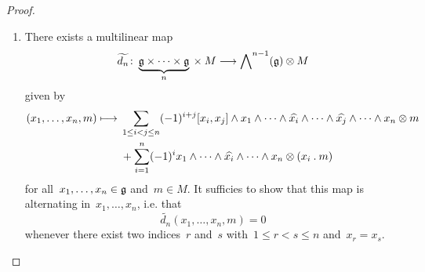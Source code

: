 \begin{proof}
	\leavevmode
	\begin{enumerate}
		\item
			There exists a multilinear map
			\[
				\widetilde{d_n}
				\colon
				\underbrace{ \glie \times \dotsb \times \glie }_{n} {} \times M
				\to
				\Exterior^{n-1}(\glie) \tensor M
			\]
			given by
			\begin{align}
				(x_1, \dotsc, x_n, m)
				\mapsto
				{}&
				\sum_{1 \leq i < j \leq n}
				(-1)^{i+j}
				[x_i, x_j] \wedge x_1 \wedge \dotsb \wedge \widehat{x_i} \wedge \dotsb \wedge \widehat{x_j} \wedge \dotsb \wedge x_n \tensor m
				\label{first term for homology}
				\\
				{}&
				+
				\sum_{i=1}^n
				(-1)^i
				x_1 \wedge \dotsb \wedge \widehat{x_i} \wedge \dotsb \wedge x_n \tensor (x_i \act m)
				\label{second term for homology}
			\end{align}
			for all~$x_1, \dotsc, x_n \in \mathfrak{g}$ and~$m \in M$.
			It sufficies to show that this map is alternating in~$x_1, \dotsc, x_n$, i.e. that
			\[
				\widetilde{d_n}(x_1, \dotsc, x_n, m) = 0
			\]
			whenever there exist two indices~$r$ and~$s$ with~$1 \leq r < s \leq n$ and~$x_r = x_s$.%


\end{enumerate}
\end{proof}
